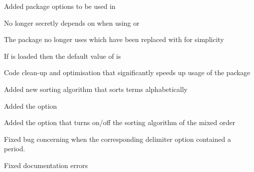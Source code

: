 \begin{changelog}
\begin{change}[version = 1.1, date = 2021-06-03, beta = false]
			\item Added package options to be used in 
			\item No longer secretly depends on  when using \xetex{} or \luatex
			\item The package no longer uses  which have been replaced with  for simplicity
			\item If  is loaded then the default value of  is 
		\end{change}
		\begin{change}[version = 1.2, date = 2022-07-09, beta = false]
			\item Code clean-up and optimisation that significantly speeds up usage of the package
			\item Added new sorting algorithm  that sorts terms alphabetically
			\item Added the option 
			\item Added the option  that turns on/off the sorting algorithm of the mixed order
			\item Fixed bug concerning  when the corresponding delimiter option contained a period.
			\item Fixed documentation errors
		\end{change}
	\end{changelog}

